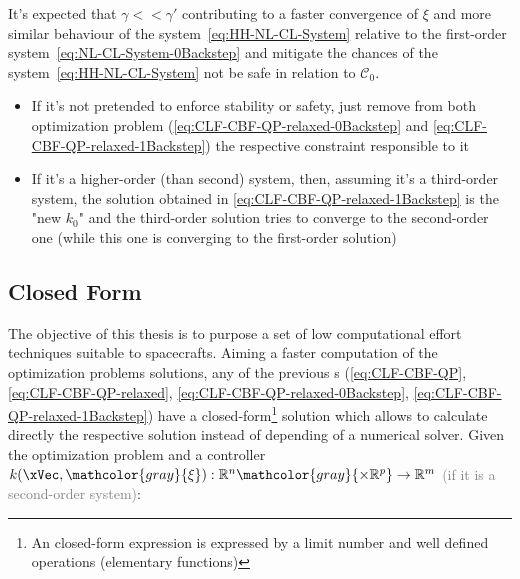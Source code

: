 It's expected that  \( \gamma << \gamma'\)  contributing to a faster convergence of \(\xi\) and more similar behaviour of the system~\ref{eq:HH-NL-CL-System} relative to the first-order system~\ref{eq:NL-CL-System-0Backstep} and mitigate the chances of the system~\ref{eq:HH-NL-CL-System} not be safe in relation to \(\mathcal{C}_0\). \\

\begin{tcolorbox}[colback=blue!5!white,colframe=blue!35!white,title=Notes:]
\begin{itemize}
    \item If it's not pretended to enforce stability or safety, just remove from both optimization problem (\ref{eq:CLF-CBF-QP-relaxed-0Backstep} and \ref{eq:CLF-CBF-QP-relaxed-1Backstep}) the respective constraint responsible to it
    \item If it's a higher-order (than second) system, then, assuming it's a third-order system, the solution obtained in \ref{eq:CLF-CBF-QP-relaxed-1Backstep} is the "new \(k_0\)" and the third-order solution tries to converge to the second-order one (while this one is converging to the first-order solution)
\end{itemize}
\end{tcolorbox} 



\subsection{Closed Form}
\label{sub:closed_form}

The objective of this thesis is to purpose a set of low computational effort techniques suitable to spacecrafts. Aiming a faster computation of the optimization problems solutions, any of the previous s (\ref{eq:CLF-CBF-QP}, \ref{eq:CLF-CBF-QP-relaxed}, \ref{eq:CLF-CBF-QP-relaxed-0Backstep}, \ref{eq:CLF-CBF-QP-relaxed-1Backstep}) have a closed-form\footnote{An closed-form expression is expressed by a limit number and well defined operations (elementary functions)} solution which allows to calculate directly the respective solution instead of depending of a numerical solver. Given the  optimization problem and a controller \(k(\xVec, \mathcolor{gray}{\mathbf{\xi}}): \mathbb{R}^n \mathcolor{gray}{\times \mathbb{R}^p} \to \mathbb{R}^m\) \textcolor{gray}{(if it is a second-order system)}:

